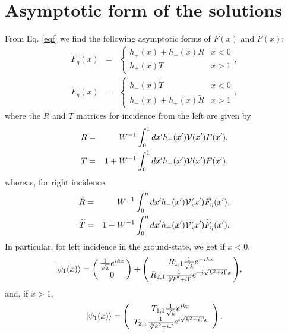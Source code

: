 \section{Asymptotic form of the solutions}
%
From Eq. \eqref{eqf} we find the following asymptotic forms of  $F(x)$ and $\widetilde{F}(x)$:
%
\begin{eqnarray}
	F_{\eta}(x)&=& \begin{cases}
	h_{+}(x)+h_{-}(x)R  & x<0  \\ h_{+}(x)T & x>1
	\end{cases},
	\nonumber\\
	\widetilde{F}_{\eta}(x)&=&\begin{cases}
	h_{-}(x)\widetilde{T}  &  x<0  \\ h_{-}(x)+h_{+}(x)\widetilde{R} & x>1
	\end{cases},
\end{eqnarray}
%
where the $R$ and $T$ matrices for incidence from the left are given by
%
\begin{eqnarray}
	R &=& W^{-1}\int_{0}^{1} dx' h_{+}(x'){\cal V}(x')F (x'),
	\nonumber\\
	T &=& \mathbf{1}+W^{-1}\int_{0}^{1} dx' h_{-}(x'){\cal V}(x')F (x'),
\end{eqnarray}
%
whereas, for right incidence,
%
\begin{eqnarray}
	\widetilde{R} &=& W^{-1}\int_{0}^{\eta} dx' h_{-}(x'){\cal V}(x')\widetilde{F}_{\eta}(x'),
	\nonumber\\
	\widetilde{T} &=& \mathbf{1}+W^{-1}\int_{0}^{\eta} dx' h_{+}(x'){\cal V}(x')\widetilde{F}_{\eta}(x').
\end{eqnarray}
%
In particular, for left incidence  in the ground-state, we get  if $x < 0$,
%
\begin{eqnarray}
	\hspace*{-.5cm}|\psi_1 (x)\ra = \left(\!\!\begin{array}{c} \frac{1}{\sqrt{k}}e^{i k x} \\ 0\end{array}\!\!\right)
	+ \left(\!\!\begin{array}{c}
	R_{1,1} \frac{1}{\sqrt{k}}e^{-i k x} \\
	R_{2,1} \frac{1}{\sqrt[4]{k^2+i \Gamma}} e^{- i \sqrt{k^2+i \Gamma} x}
	\end{array}\!\!\right)\!,
	\label{as-}
\end{eqnarray}
%
and, if $x>1$,
%
\begin{eqnarray}
	|\psi_1 (x)\ra = \left(\begin{array}{c}
	T_{1,1} \frac{1}{\sqrt{k}}e^{i k x} \\
	T_{2,1} \frac{1}{\sqrt[4]{k^2+i \Gamma}} e^{i \sqrt{k^2+i \Gamma} x}
	\end{array}\right).
	\label{as+}
\end{eqnarray}
